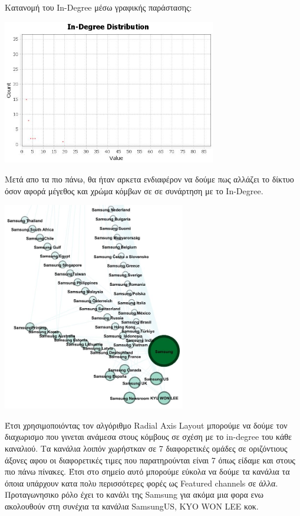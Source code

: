 \documentclass[12pt]{article}
\begin{document}
	\newpage
	Κατανομή του In-Degree μέσω γραφικής παράστασης:
	\begin{center}
		\includegraphics[width=0.7\textwidth]{photos-files/section6/in-degree_graphical.JPG}
	\end{center}
	Μετά απο τα πιο πάνω, θα ήταν αρκετα ενδιαφέρον να δούμε πως αλλάζει το δίκτυο όσον αφορά μέγεθος και χρώμα κόμβων σε σε συνάρτηση με το In-Degree.
	\begin{center}
		\includegraphics[width=0.6\textwidth]{photos-files/section6/in-degree_RE-layout.JPG}
	\end{center}
	Έτσι χρησιμοποιόντας τον αλγόριθμο Radial Axis Layout μπορούμε να δούμε τον διαχωρισμο που γινεται ανάμεσα στους κόμβους σε σχέση με το in-degree του κάθε καναλιού. Τα κανάλια λοιπόν χωρήστκαν σε 7 διαφορετικές ομάδες σε οριζόντιους άξονες αφου οι διαφορετικές τιμες που παρατηρούνται είναι 7 όπως είδαμε και στους πιο πάνω πίνακες. Έτσι στο σημείο αυτό μπορούμε εύκολα να δούμε τα κανάλια τα όποια υπάρχουν κατα πολυ περισσότερες φορές ως Featured channels σε άλλα. Προταγωνησικο ρόλο έχει το κανάλι της Samsung για ακόμα μια φορα ενω ακολουθούν στη συνέχια τα κανάλια SamsungUS,  KYO WON LEE κοκ.
	
\end{document}
